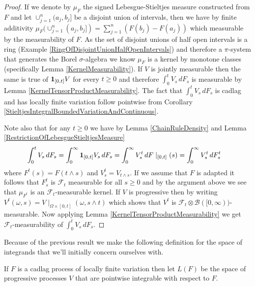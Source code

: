 \begin{proof}
If we denote by $\mu_F$ the signed Lebesgue-Stieltjes measure constructed from $F$ and let $\cup_{j=1}^n (a_j, b_j]$ be a disjoint union of intervals, then we have by finite additivity $\mu_F(\cup_{j=1}^n (a_j, b_j]) = \sum_{j=1}^n (F(b_j) - F(a_j))$ which measurable by the measurability of $F$.  As the set of disjoint unions of half open intervals is a ring (Example \ref{RingOfDisjointUnionHalfOpenIntervals}) and therefore a $\pi$-system that generates the Borel $\sigma$-algebra we know $\mu_F$ is a kernel by monotone classes (specifically Lemma \ref{KernelMeasurability}).  If $V$ is jointly measurable then the same is true of $\textbf{1}_{[0,t]} V$ for every $t \geq 0$ and therefore $\int_0^t V_s \, dF_s$ is measurable by Lemma \ref{KernelTensorProductMeasurability}.  The fact that $\int_0^t V_s \, dF_s$ is cadlag and has locally finite variation follow pointwise from Corollary \ref{StieltjesIntegralBoundedVariationAndContinuous}.

Note also that for any $t \geq 0$ we have by Lemma \ref{ChainRuleDensity} and Lemma \ref{RestrictionOfLebesgueStieltjesMeasure} 
\begin{align*}
\int_0^t V_s \, dF_s &= \int_0^\infty \textbf{1}_{[0,t]} V_s \, dF_s = \int_0^\infty V^t_s \, dF\mid_{[0,t]}(s) = \int_0^\infty V^t_s \, dF^t_s  
\end{align*} 
where $F^t(s) = F(t \wedge s)$ and $V^t_s = V_{t \wedge s}$. If we assume that $F$ is adapted it follows that $F_s^t$ is $\mathcal{F}_t$ measurable for all $s \geq 0$ and by the argument above we see that $\mu_{F^t}$ is an $\mathcal{F}_t$-measurable kernel.  If $V$ is progressive then by writing $V^t(\omega, s) = V \mid_{\Omega \times [0,t]}(\omega, s \wedge t)$ which shows that $V^t$ is $\mathcal{F}_t \otimes \mathcal{B}([0,\infty))$-measurable.  Now applying Lemma \ref{KernelTensorProductMeasurability} we get $\mathcal{F}_t$-measurability of $\int_0^t V_s \, dF_s$.
\end{proof}

Because of the previous result we make the following definition for the space of integrands that we'll initially concern ourselves with.
\begin{defn}If $F$ is a cadlag process of locally finite variation then let $L(F)$ be the space of progressive processes $V$ that are pointwise integrable with respect to $F$.
\end{defn}

